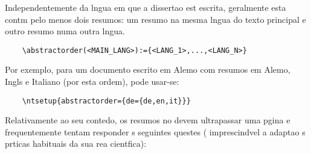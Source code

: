 ﻿%

%

Independentemente da lngua em que a dissertao est escrita, geralmente esta contm pelo menos dois resumos: um resumo na mesma lngua do texto principal e outro resumo numa outra lngua.
%
\begin{verbatim}
    \abstractorder(<MAIN_LANG>):={<LANG_1>,...,<LANG_N>}
\end{verbatim}

Por exemplo, para um documento escrito em Alemo com resumos em Alemo, Ingls e Italiano (por esta ordem), pode usar-se:
\begin{verbatim}
    \ntsetup{abstractorder={de={de,en,it}}}
\end{verbatim}

Relativamente ao seu contedo, os resumos no devem ultrapassar uma pgina e frequentemente tentam responder s seguintes questes ( imprescindvel a adaptao s prticas habituais da sua rea cientfica):


%
%



